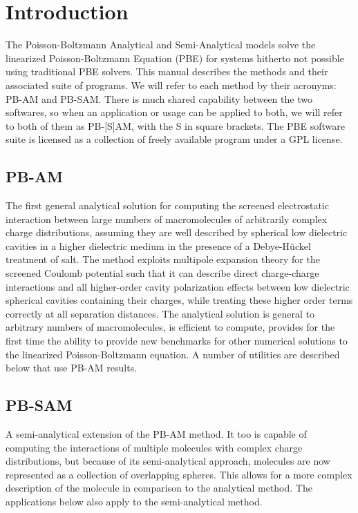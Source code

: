 
\chapter{Introduction}

The Poisson-Boltzmann Analytical and Semi-Analytical models solve the linearized Poisson-Boltzmann Equation 
(PBE) for systems hitherto not possible using traditional PBE solvers. This manual describes 
the methods and their associated suite of programs. We will refer to each method by their acronyms:
PB-AM and PB-SAM. There is much shared capability between the two softwares, so when an application
or usage can be applied to both, we will refer to both of them as PB-[S]AM, with the S in square brackets.
The PBE software suite is licensed as a collection of freely available program under a GPL license. 


\section{PB-AM} The first general analytical solution for computing the screened electrostatic 
interaction between large numbers of macromolecules of arbitrarily complex charge distributions, 
assuming they are well described by spherical low dielectric cavities in a higher dielectric 
medium in the presence of a Debye-H{\"u}ckel treatment of salt. The method exploits 
multipole expansion theory for the screened Coulomb potential such that it can describe direct 
charge-charge interactions and all higher-order cavity polarization effects between low dielectric 
spherical cavities containing their charges, while treating these higher order terms correctly 
at all separation distances. The analytical solution is general to arbitrary numbers of 
macromolecules, is efficient to compute, provides for the first time the ability to provide new 
benchmarks for other numerical solutions to the linearized Poisson-Boltzmann equation. A 
number of utilities are described below that use PB-AM results.

\section{PB-SAM} 

A semi-analytical extension of the PB-AM method. It too is capable of computing the interactions
of multiple molecules with complex charge distributions, but because of its semi-analytical approach, 
molecules are now represented as a collection of overlapping spheres. This allows for a more complex
description of the molecule in comparison to the analytical method. The applications below also apply to the 
semi-analytical method.

